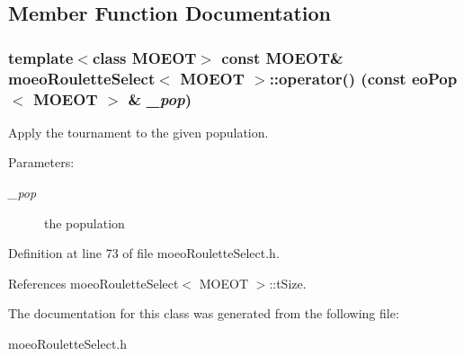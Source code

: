\subsection{Member Function Documentation}
\subsubsection{\setlength{\rightskip}{0pt plus 5cm}template$<$class MOEOT$>$ const MOEOT\& \bf{moeo\-Roulette\-Select}$<$ MOEOT $>$::operator() (const \bf{eo\-Pop}$<$ MOEOT $>$ \& {\em \_\-pop})\hspace{0.3cm}{\tt  [inline]}}\label{classmoeoRouletteSelect_573fe156daf6fdfbae96d2b54a9fc260}


Apply the tournament to the given population. 

\begin{Desc}
\item[Parameters:]
\begin{description}
\item[{\em \_\-pop}]the population \end{description}
\end{Desc}


Definition at line 73 of file moeo\-Roulette\-Select.h.

References moeo\-Roulette\-Select$<$ MOEOT $>$::t\-Size.

The documentation for this class was generated from the following file:\begin{CompactItemize}
\item 
moeo\-Roulette\-Select.h\end{CompactItemize}
